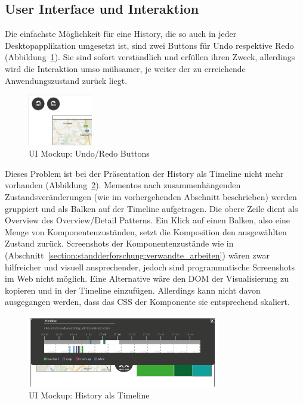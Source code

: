 \documentclass[
	headsepline,
	footsepline,
	fontsize=12pt,
	bibliography=totoc
]{scrbook}
\begin{document}
\subsection{User Interface und Interaktion}
\label{section:konzeption:history:ui}


Die einfachste Möglichkeit für eine History, die so auch in jeder Desktopapplikation umgesetzt ist, sind zwei Buttons für Undo respektive Redo (Abbildung~\ref{figure:undo-simple}). Sie sind sofort verständlich und erfüllen ihren Zweck, allerdings wird die Interaktion umso mühsamer, je weiter der zu erreichende Anwendungszustand zurück liegt.

\begin{figure}[htbp]
   \centering
   \includegraphics[width=0.25\textwidth]{images/konzeption-undo-simple.png}
   \caption{UI Mockup: Undo/Redo Buttons}
   \label{figure:undo-simple}
\end{figure}

Dieses Problem ist bei der Präsentation der History als Timeline nicht mehr vorhanden (Abbildung~\ref{figure:undo-timeline-simple}). Mementos nach zusammenhängenden Zustandsveränderungen (wie im vorhergehenden Abschnitt beschrieben) werden gruppiert und als Balken auf der Timeline aufgetragen. Die obere Zeile dient als Overview des Overview/Detail Patterns. Ein Klick auf einen Balken, also eine Menge von Komponentenzuständen, setzt die Komposition den ausgewählten Zustand zurück. Screenshots der Komponentenzustände wie in \cite{Heer2008} (Abschnitt~\ref{section:standderforschung:verwandte_arbeiten}) wären zwar hilfreicher und visuell ansprechender, jedoch sind programmatische Screenshots im Web nicht möglich. Eine Alternative wäre den DOM der Visualisierung zu kopieren und in der Timeline einzufügen. Allerdings kann nicht davon ausgegangen werden, dass das CSS der Komponente sie entsprechend skaliert.

\begin{figure}[htbp]
   \centering
   \includegraphics[width=0.75\textwidth]{images/konzeption-undo-timeline-simple.png}
   \caption{UI Mockup: History als Timeline}
   \label{figure:undo-timeline-simple}
\end{figure}
\end{document}
